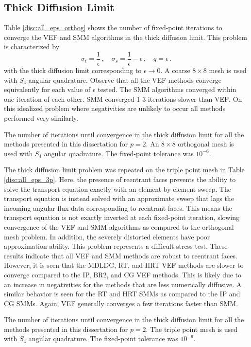 \documentclass[../doc.tex]{subfiles}
\begin{document}
\subsection{Thick Diffusion Limit}
Table \ref{disc:all_eps_orthog} shows the number of fixed-point iterations to converge the VEF and SMM algorithms in the thick diffusion limit. This problem is characterized by 
	\begin{equation}
		\sigma_t = \frac{1}{\epsilon} \,, \quad \sigma_s = \frac{1}{\epsilon} - \epsilon \,, \quad q = \epsilon \,. 
	\end{equation}
with the thick diffusion limit corresponding to $\epsilon \rightarrow 0$. A coarse $8\times 8$ mesh is used with $S_4$ angular quadrature. Observe that all the VEF methods converge equivalently for each value of $\epsilon$ tested. The SMM algorithms converged within one iteration of each other. SMM converged 1-3 iterations slower than VEF. On this idealized problem where negativities are unlikely to occur all methods performed very similarly. 
\begin{table}
\centering
\caption{The number of iterations until convergence in the thick diffusion limit for all the methods presented in this dissertation for $p=2$. An $8\times 8$ orthogonal mesh is used with $S_4$ angular quadrature. The fixed-point tolerance was $10^{-6}$.}
\label{disc:all_eps_orthog}

\end{table}

The thick diffusion limit problem was repeated on the triple point mesh in Table \ref{disc:all_eps_3p}. Here, the presence of reentrant faces prevents the ability to solve the transport equation exactly with an element-by-element sweep. The transport equation is instead solved with an approximate sweep that lags the incoming angular flux data corresponding to reentrant faces. This means the transport equation is not exactly inverted at each fixed-point iteration, slowing convergence of the VEF and SMM algorithms as compared to the orthogonal mesh problem. In addition, the severely distorted elements have poor approximation ability. This problem represents a difficult stress test. These results indicate that all VEF and SMM methods are robust to reentrant faces. However, it is seen that the MDLDG, RT, and HRT VEF methods are slower to converge compared to the IP, BR2, and CG VEF methods. This is likely due to an increase in negativities for the methods that are less numerically diffusive. A similar behavior is seen for the RT and HRT SMMs as compared to the IP and CG SMMs. Again, VEF generally converges a few iterations faster than SMM. 
\begin{table}
\centering
\caption{The number of iterations until convergence in the thick diffusion limit for all the methods presented in this dissertation for $p=2$. The triple point mesh is used with $S_4$ angular quadrature. The fixed-point tolerance was $10^{-6}$.}
\label{disc:all_eps_3p}

\end{table}
\end{document}
